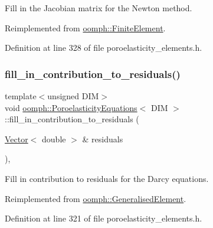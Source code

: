 Fill in the Jacobian matrix for the Newton method. 



Reimplemented from \hyperlink{classoomph_1_1FiniteElement_a0ae7af222af38a0d53bf283dc85bdfea}{oomph\+::\+Finite\+Element}.



Definition at line 328 of file poroelasticity\+\_\+elements.\+h.

\mbox{\label{classoomph_1_1PoroelasticityEquations_a5f6d7585f4bb6c27c4cb4134fcf1f5a7}} 
\subsubsection{\texorpdfstring{fill\+\_\+in\+\_\+contribution\+\_\+to\+\_\+residuals()}{fill\_in\_contribution\_to\_residuals()}}
{\footnotesize\ttfamily template$<$unsigned D\+IM$>$ \\
void \hyperlink{classoomph_1_1PoroelasticityEquations}{oomph\+::\+Poroelasticity\+Equations}$<$ D\+IM $>$\+::fill\+\_\+in\+\_\+contribution\+\_\+to\+\_\+residuals (\begin{DoxyParamCaption}\item[{\hyperlink{classoomph_1_1Vector}{Vector}$<$ double $>$ \&}]{residuals }\end{DoxyParamCaption})\hspace{0.3cm}{\ttfamily [inline]}, {\ttfamily [virtual]}}



Fill in contribution to residuals for the Darcy equations. 



Reimplemented from \hyperlink{classoomph_1_1GeneralisedElement_a310c97f515e8504a48179c0e72c550d7}{oomph\+::\+Generalised\+Element}.



Definition at line 321 of file poroelasticity\+\_\+elements.\+h.

\mbox{\label{classoomph_1_1PoroelasticityEquations_a50bcb2f690fb903504c03ea1cc747477}} 
